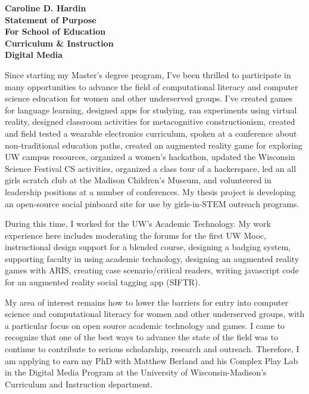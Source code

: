 \documentclass[12pt]{letter}
\begin{document}
\begin{letter}

\noindent 
\large\textbf{Caroline D. Hardin\\
Statement of Purpose\\
For School of Education\\
Curriculum \& Instruction\\
Digital Media
}
\vfill


\signature{Caroline D. Hardin} %

Since starting my Master’s degree program, I’ve been thrilled to participate in many opportunities to advance the field of computational literacy and computer science education for women and other underserved groups. I’ve created games for language learning, designed apps for studying, ran experiments using virtual reality, designed classroom activities for metacognitive constructionism, created and field tested a wearable electronics curriculum, spoken at a conference about non-traditional education paths, created an augmented reality game for exploring UW campus resources, organized a women’s hackathon, updated the Wisconsin Science Festival CS activities, organized a class tour of a hackerspace, led an all girls scratch club at the Madison Children’s Museum, and volunteered in leadership positions at a number of conferences. My thesis project is developing an open-source social pinboard site for use by girls-in-STEM outreach programs.

During this time, I worked for the UW’s Academic Technology. My work experience here includes moderating the forums for the first UW Mooc, instructional design support for a blended course, designing a badging system, supporting faculty in using academic technology, designing an augmented reality games with ARIS, creating case scenario/critical readers, writing javascript code for an augmented reality social tagging app (SIFTR).

My area of interest remains how to lower the barriers for entry into computer science and computational literacy for women and other underserved groups, with a particular focus on open source academic technology and games. I came to recognize that one of the best ways to advance the state of the field was to continue to contribute to serious scholarship, research and outreach. Therefore, I am applying to earn my PhD with Matthew Berland and his Complex Play Lab in the Digital Media Program at the University of Wisconsin-Madison’s Curriculum and Instruction department. 


\end{letter}
\end{document}

